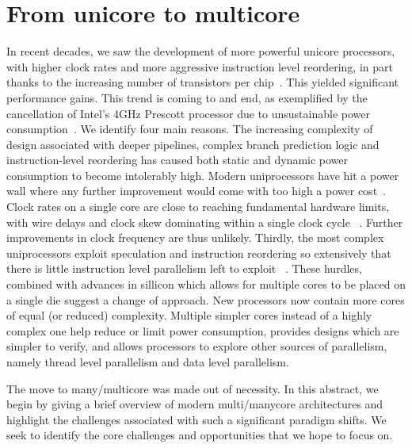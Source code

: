 \section{From unicore to multicore}

In recent decades, we saw the development of more powerful
unicore processors, with higher clock rates and more
aggressive instruction level reordering, in part
thanks to the increasing number of transistors per chip~\cite{SR97}.
This yielded significant performance gains. This trend is coming to and end,
as exemplified by the cancellation of Intel's
4GHz Prescott processor due to unsustainable
power consumption~\cite{Pentium}. We identify
four main reasons. The increasing complexity
of design associated with deeper pipelines,
complex branch prediction logic and instruction-level
reordering has caused both static and dynamic power consumption
to become intolerably high. Modern uniprocessors have hit
a power wall where any further improvement would come
with too high a power cost~\cite{EH11}. Clock rates on
a single core are close to reaching fundamental hardware limits,
with wire delays and clock skew dominating within a single clock cycle ~\cite{EH11}.
Further improvements in clock frequency are thus unlikely. Thirdly, the most
complex uniprocessors exploit speculation and instruction reordering so
extensively that there is little instruction level parallelism left to
exploit ~\cite{EH11}. These hurdles, combined with advances in sillicon which allows
for multiple cores to be placed on a single die suggest a change of approach.
 New processors now contain more cores of equal (or reduced) complexity.
Multiple simpler cores instead of a highly complex one help reduce or limit power consumption,
provides designs which are simpler to verify, and allows processors
to explore other sources of parallelism, namely thread level parallelism
and data level parallelism.

The move to many/multicore was made out of necessity. In this abstract, we begin
by giving a brief overview of modern multi/manycore architectures and highlight
the challenges associated with such a significant paradigm shifts. We
seek to identify the core challenges and opportunities that we hope to focus on. 


